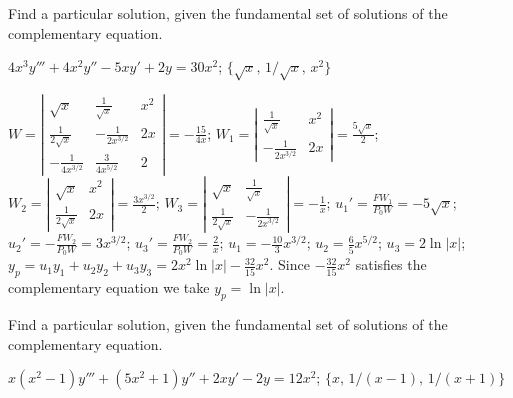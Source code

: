 \documentclass{ximera}
\begin{document}
\begin{problem}\label{exer:9.4.8}
Find a particular
solution, given the fundamental set of solutions of the complementary equation.

$4x^3y'''+4x^2y''-5xy'+2y=30x^2$; \quad  $\{\sqrt x,\,1/\sqrt x,\,x^2\}$

\begin{solution}
$W=\left|\begin{array}{cccc}
\sqrt{x}&\frac{1}{\sqrt{x}}&x^2\\
\frac{1}{2\sqrt{x}}&-\frac{1}{2x^{3/2}}&2x\\
-\frac{1}{4x^{3/2}}&\frac{3}{4x^{5/2}}&2
\end{array}\right|=-\frac{15}{4x}$;
$W_1=\left|\begin{array}{cccc}
\frac{1}{\sqrt{x}}&x^2\\
-\frac{1}{2x^{3/2}}&2x
\end{array}\right|=\frac{5\sqrt{x}}{2}$;
$W_2=\left|\begin{array}{cccc}
\sqrt{x}&x^2\\
\frac{1}{2\sqrt{x}}&2x
\end{array}\right|=\frac{3x^{3/2}}{2}$;
$W_3=\left|\begin{array}{cccc}
\sqrt{x}&\frac{1}{\sqrt{x}}\\
\frac{1}{2\sqrt{x}}&-\frac{1}{2x^{3/2}}
\end{array}\right|=-\frac{1}{x}$;
$u_1'=\frac{FW_1}{P_0W}=-5\sqrt{x}$;
$u_2'=-\frac{FW_2}{P_0W}=3x^{3/2}$;
$u_3'=\frac{FW_2}{P_0W}=\frac{2}{x}$;
$u_1=-\frac{10}{3}x^{3/2}$;
$u_2=\frac{6}{5}x^{5/2}$;
$u_3=2\ln|x|$;
$y_p=u_1y_1+u_2y_2+u_3y_3=2x^2\ln|x|-\frac{32}{15}x^2$.
Since $-\frac{32}{15}x^2$ satisfies the complementary equation
we take $y_p=\ln|x|$.
\end{solution}
\end{problem}

\begin{problem}\label{exer:9.4.9}
Find a particular
solution, given the fundamental set of solutions of the complementary equation.

$x(x^2-1)y'''+(5x^2+1)y''+2xy'-2y=12x^2$; \quad
$\{x,\,1/(x-1),\,1/(x+1)\}$
\end{problem}
\end{document}

